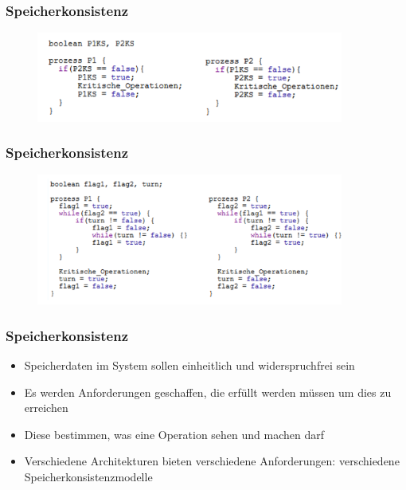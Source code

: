 \documentclass{sikslides}
\begin{document}
\begin{frame}
\frametitle{Speicherkonsistenz}
	\begin{figure}[htbp] 
  \centering
  \includegraphics[width=0.9\textwidth]{figures/problem1.png}
  \label{Fig:gpum}
\end{figure}
\end{frame}

\begin{frame}
\frametitle{Speicherkonsistenz}
	\begin{figure}[htbp] 
  \centering
  \includegraphics[width=0.9\textwidth]{figures/problem2.png}
  \label{Fig:gpum}
\end{figure}
\end{frame}


\begin{frame}
	\frametitle{Speicherkonsistenz}
	\begin{itemize}
		\item Speicherdaten im System sollen einheitlich und widerspruchfrei sein
\bigskip
		\item Es werden Anforderungen geschaffen, die erfüllt werden müssen um dies zu erreichen
\bigskip
		\item Diese bestimmen, was eine Operation sehen und machen darf
\bigskip
		\item Verschiedene Architekturen bieten verschiedene Anforderungen: verschiedene Speicherkonsistenzmodelle
	\end{itemize}
\end{frame}


\end{document}
